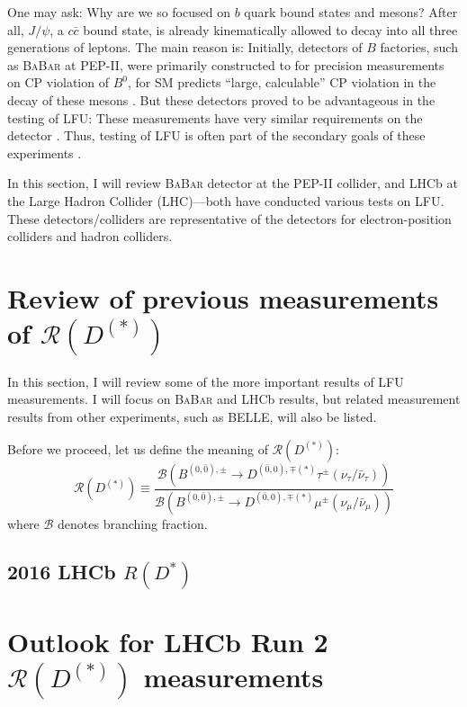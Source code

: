 \documentclass[10pt]{article}
\newcommand{\PRLrule}{
    \bigskip
    \noindent\makebox[\linewidth]{
        \resizebox{0.3333\linewidth}{1pt}{$\blacklozenge$}
    }
    \bigskip
}
\def\BaBar/{\textsc{BaBar}}
\def\RDDst/{\ensuremath{\mathcal{R}(D^{(*)})}}
\begin{document}
One may ask: Why are we so focused on $b$ quark bound states and mesons?
After all, $J/\psi$, a $c\bar{c}$ bound state, is already kinematically allowed
to decay into all three generations of leptons.
The main reason is:
Initially, detectors of $B$ factories, such as \BaBar/ at PEP-II, were
primarily constructed to for precision measurements on CP violation of $B^0$,
for SM predicts ``large, calculable'' CP violation in the decay of these mesons
\cite{Luth:1994}.
But these detectors proved to be advantageous in the testing of LFU:
These measurements have very similar requirements on the
detector \cite{Boutigny:1995ib}.
Thus, testing of LFU is often part of the secondary goals of these
experiments \cite{Luth:1994}.

In this section, I will review \BaBar/ detector at the PEP-II collider, and LHCb
at the Large Hadron Collider (LHC)---both have conducted various tests on LFU.
These detectors/colliders are representative of the detectors for
electron-position colliders and hadron colliders.





\section{Review of previous measurements of \RDDst/}
In this section, I will review some of the more important results of LFU
measurements.
I will focus on \BaBar/ and LHCb results, but related measurement results from
other experiments, such as BELLE, will also be listed.

Before we proceed, let us define the meaning of \RDDst/:
\begin{equation*}
    \RDDst/ \equiv \frac{
        \mathcal{B}\left(
        B^{(0,\bar{0}),\pm} \longrightarrow D^{(\bar{0},0),\mp(*)} \tau^{\pm}
            \left(\nu_{\tau}/\bar{\nu}_{\tau}\right)\right)
        }{
        \mathcal{B}\left(
        B^{(0,\bar{0}),\pm} \longrightarrow D^{(\bar{0},0),\mp(*)} \mu^{\pm}
            \left(\nu_{\mu}/\bar{\nu}_{\mu}\right)\right)
        }
\end{equation*}
where $\mathcal{B}$ denotes branching fraction.



\subsection{2016 LHCb $R(D^{*})$}



\section{Outlook for LHCb Run 2 \RDDst/ measurements}



\PRLrule
\printbibliography
\end{document}
